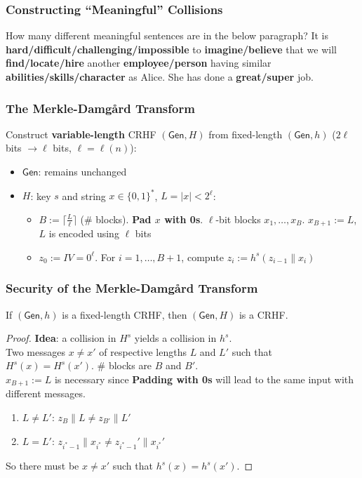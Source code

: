 \begin{frame}\frametitle{Constructing ``Meaningful'' Collisions}
\begin{exampleblock}{How many different meaningful sentences are in the below paragraph?}
It is \textbf{hard/difficult/challenging/impossible} to \textbf{imagine/believe} that we will \textbf{find/locate/hire} another \textbf{employee/person} having similar \textbf{abilities/skills/character} as Alice. She has done a \textbf{great/super} job.
\end{exampleblock}
\end{frame}
\begin{frame}\frametitle{The Merkle-Damg\r{a}rd Transform}
\begin{figure}
\begin{center}

\end{center}
\end{figure}
\begin{construction}
Construct \textbf{variable-length} CRHF $(\mathsf{Gen}, H)$ from fixed-length $(\mathsf{Gen}, h)$ ($2\ell$ bits $\to \ell$ bits, $\ell = \ell(n)$):
\begin{itemize}
\item $\mathsf{Gen}$: remains unchanged
\item $H$: key $s$ and string $x \in \{0,1\}^*$, $L=|x|< 2^{\ell}$:
\begin{itemize}
\item $B := \lceil \frac{L}{\ell} \rceil$ (\# blocks). \textbf{Pad $x$ with 0s}.  $\ell$-bit blocks $x_1,\dotsc,x_B$. $x_{B+1} := L$, $L$ is encoded using $\ell$ bits
\item $z_0 := IV = 0^\ell$. For $i=1,\dotsc,B+1$, compute $z_i := h^s(z_{i-1}\| x_i)$
\end{itemize}
\end{itemize}
\end{construction}
\end{frame}
\begin{frame}\frametitle{Security of the Merkle-Damg\r{a}rd Transform}
\begin{theorem}
If $(\mathsf{Gen},h)$ is a fixed-length CRHF, then $(\mathsf{Gen},H)$ is a CRHF.
\end{theorem}
\begin{proof}
\textbf{Idea}: a collision in $H^s$ yields a collision in $h^s$. \\
Two messages $x \ne x'$ of respective lengths $L$ and $L'$ such that $H^s(x) = H^s(x')$. \# blocks are $B$ and $B'$. \\
$x_{B+1} := L$ is necessary since \textbf{Padding with 0s} will lead to the same input with different messages.
\begin{enumerate}
\item $L \ne L'$: $z_B\| L \ne z_{B'}\| L'$
\item $L = L'$: $z_{i^*-1}\| x_{i^*} \ne z_{i^*-1}'\| x_{i^*}'$
\end{enumerate}
So there must be $x \neq x'$ such that $h^s(x) = h^s(x')$.
\end{proof}
\end{frame}
